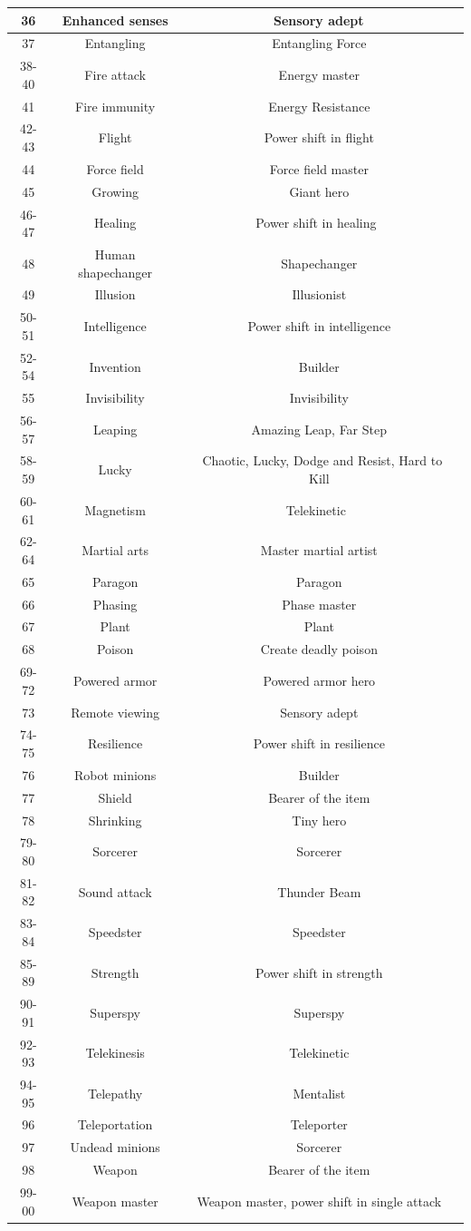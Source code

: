 \begin{longtable}{| c | c | c |}
36 & Enhanced senses & Sensory adept \\ \hline
37 & Entangling & Entangling Force \\ \hline
38-40 & Fire attack & Energy master \\ \hline
41 & Fire immunity & Energy Resistance \\ \hline
42-43 & Flight & Power shift in flight \\ \hline
44 & Force field & Force field master \\ \hline
45 & Growing & Giant hero \\ \hline
46-47 & Healing & Power shift in healing  \\ \hline
48 & Human shapechanger & Shapechanger \\ \hline
49 & Illusion & Illusionist \\ \hline
50-51 & Intelligence & Power shift in intelligence \\ \hline
52-54 & Invention & Builder \\ \hline
55 & Invisibility & Invisibility \\ \hline
56-57 & Leaping & Amazing Leap, Far Step \\ \hline
58-59 & Lucky & Chaotic, Lucky, Dodge and Resist, Hard to Kill \\ \hline
60-61 & Magnetism & Telekinetic  \\ \hline
62-64 & Martial arts & Master martial artist \\ \hline
65 & Paragon & Paragon \\ \hline
66 & Phasing & Phase master \\ \hline
67 & Plant & Plant \\ \hline
68 & Poison & Create deadly poison \\ \hline
69-72 & Powered armor & Powered armor hero \\ \hline
73 & Remote viewing & Sensory adept \\ \hline
74-75 & Resilience & Power shift in resilience \\ \hline
76 & Robot minions & Builder \\ \hline
77 & Shield & Bearer of the item \\ \hline
78 & Shrinking & Tiny hero \\ \hline
79-80 & Sorcerer & Sorcerer \\ \hline
81-82 & Sound attack & Thunder Beam \\ \hline
83-84 & Speedster & Speedster \\ \hline
85-89 & Strength & Power shift in strength \\ \hline
90-91 & Superspy & Superspy \\ \hline
92-93 & Telekinesis & Telekinetic \\ \hline
94-95 & Telepathy & Mentalist \\ \hline
96 & Teleportation & Teleporter \\ \hline
97 & Undead minions & Sorcerer \\ \hline
98 & Weapon & Bearer of the item \\ \hline
99-00 & Weapon master & Weapon master, power shift in single attack \\ \hline


\end{longtable}
